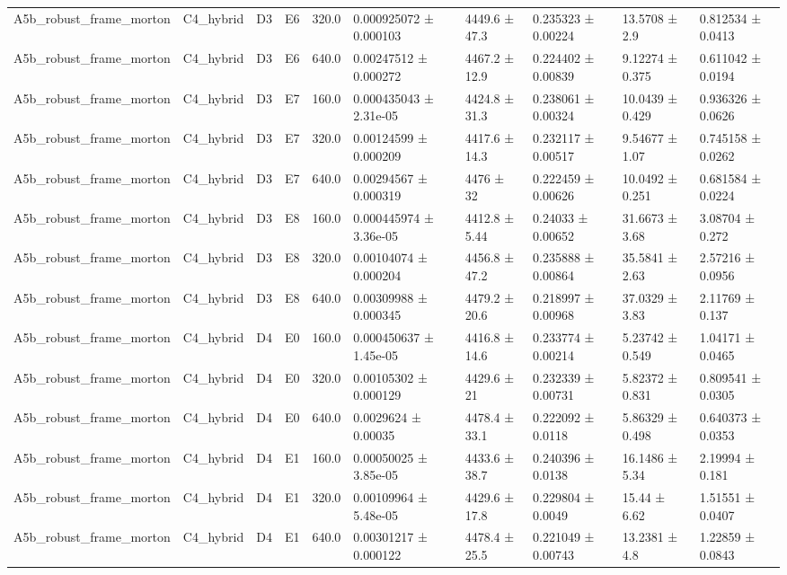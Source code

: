\begin{table}
\begin{tabular}{llllllllll}
A5b\_robust\_frame\_morton & C4\_hybrid & D3 & E6 & 320.0 & 0.000925072 ± 0.000103 & 4449.6 ± 47.3 & 0.235323 ± 0.00224 & 13.5708 ± 2.9 & 0.812534 ± 0.0413 \\
A5b\_robust\_frame\_morton & C4\_hybrid & D3 & E6 & 640.0 & 0.00247512 ± 0.000272 & 4467.2 ± 12.9 & 0.224402 ± 0.00839 & 9.12274 ± 0.375 & 0.611042 ± 0.0194 \\
A5b\_robust\_frame\_morton & C4\_hybrid & D3 & E7 & 160.0 & 0.000435043 ± 2.31e-05 & 4424.8 ± 31.3 & 0.238061 ± 0.00324 & 10.0439 ± 0.429 & 0.936326 ± 0.0626 \\
A5b\_robust\_frame\_morton & C4\_hybrid & D3 & E7 & 320.0 & 0.00124599 ± 0.000209 & 4417.6 ± 14.3 & 0.232117 ± 0.00517 & 9.54677 ± 1.07 & 0.745158 ± 0.0262 \\
A5b\_robust\_frame\_morton & C4\_hybrid & D3 & E7 & 640.0 & 0.00294567 ± 0.000319 & 4476 ± 32 & 0.222459 ± 0.00626 & 10.0492 ± 0.251 & 0.681584 ± 0.0224 \\
A5b\_robust\_frame\_morton & C4\_hybrid & D3 & E8 & 160.0 & 0.000445974 ± 3.36e-05 & 4412.8 ± 5.44 & 0.24033 ± 0.00652 & 31.6673 ± 3.68 & 3.08704 ± 0.272 \\
A5b\_robust\_frame\_morton & C4\_hybrid & D3 & E8 & 320.0 & 0.00104074 ± 0.000204 & 4456.8 ± 47.2 & 0.235888 ± 0.00864 & 35.5841 ± 2.63 & 2.57216 ± 0.0956 \\
A5b\_robust\_frame\_morton & C4\_hybrid & D3 & E8 & 640.0 & 0.00309988 ± 0.000345 & 4479.2 ± 20.6 & 0.218997 ± 0.00968 & 37.0329 ± 3.83 & 2.11769 ± 0.137 \\
A5b\_robust\_frame\_morton & C4\_hybrid & D4 & E0 & 160.0 & 0.000450637 ± 1.45e-05 & 4416.8 ± 14.6 & 0.233774 ± 0.00214 & 5.23742 ± 0.549 & 1.04171 ± 0.0465 \\
A5b\_robust\_frame\_morton & C4\_hybrid & D4 & E0 & 320.0 & 0.00105302 ± 0.000129 & 4429.6 ± 21 & 0.232339 ± 0.00731 & 5.82372 ± 0.831 & 0.809541 ± 0.0305 \\
A5b\_robust\_frame\_morton & C4\_hybrid & D4 & E0 & 640.0 & 0.0029624 ± 0.00035 & 4478.4 ± 33.1 & 0.222092 ± 0.0118 & 5.86329 ± 0.498 & 0.640373 ± 0.0353 \\
A5b\_robust\_frame\_morton & C4\_hybrid & D4 & E1 & 160.0 & 0.00050025 ± 3.85e-05 & 4433.6 ± 38.7 & 0.240396 ± 0.0138 & 16.1486 ± 5.34 & 2.19994 ± 0.181 \\
A5b\_robust\_frame\_morton & C4\_hybrid & D4 & E1 & 320.0 & 0.00109964 ± 5.48e-05 & 4429.6 ± 17.8 & 0.229804 ± 0.0049 & 15.44 ± 6.62 & 1.51551 ± 0.0407 \\
A5b\_robust\_frame\_morton & C4\_hybrid & D4 & E1 & 640.0 & 0.00301217 ± 0.000122 & 4478.4 ± 25.5 & 0.221049 ± 0.00743 & 13.2381 ± 4.8 & 1.22859 ± 0.0843 \\

\end{tabular}
\end{table}
